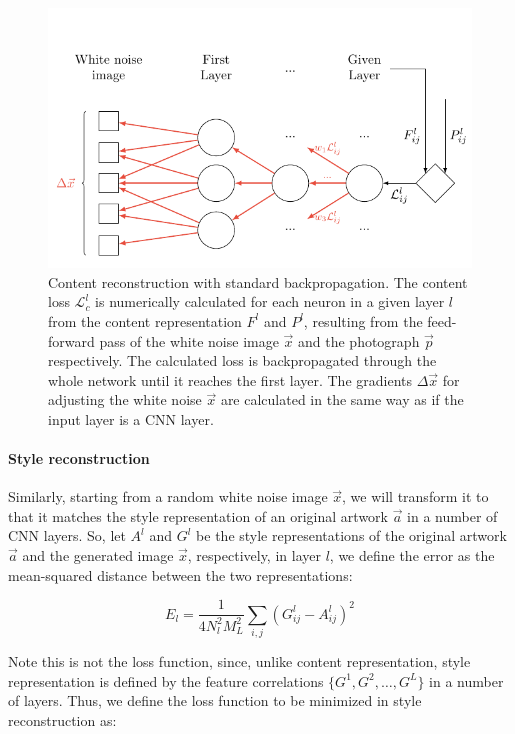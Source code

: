 \begin{figure}[htb]
  \includegraphics[width=\textwidth]{tkz/feature-reconstruction}
  \caption{
    Content reconstruction with standard backpropagation.
    The content loss $\mathcal{L}^l_c$ is numerically calculated for each neuron in a given layer $l$ from the content representation $F^l$ and $P^l$, resulting from the feed-forward pass of the white noise image $\vec{x}$ and the photograph $\vec{p}$ respectively.
    The calculated loss is backpropagated through the whole network until it reaches the first layer.
    The gradients $\Delta \vec{x}$ for adjusting the white noise $\vec{x}$ are calculated in the same way as if the input layer is a CNN layer.
  }
  \label{fig:system:method:feature-reconstruction}
\end{figure}

\paragraph{Style reconstruction}
Similarly, starting from a random white noise image $\vec{x}$, we will transform it to that it matches the style representation of an original artwork $\vec{a}$ in a number of CNN layers.
So, let $A^l$ and $G^l$ be the style representations of the original artwork $\vec{a}$ and the generated image $\vec{x}$, respectively, in layer $l$, we define the error as the mean-squared distance between the two representations:

\begin{equation}
  E_l =
  \frac{1}{4 N^2_l M^2_L} \sum_{i,j} (G^l_{ij} - A^l_{ij})^2
\end{equation}

Note this is not the loss function, since, unlike content representation, style representation is defined by the feature correlations $\{G^1, G^2, \dots, G^L\}$ in a number of layers.
Thus, we define the loss function to be minimized in style reconstruction as:

